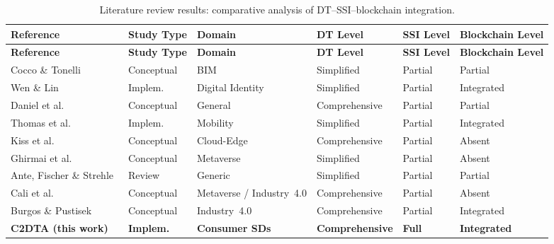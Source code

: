 \begin{longtable}{p{2.8cm} p{1.5cm} p{2cm} p{2cm} p{2cm} p{2cm}}
    \caption{Literature review results: comparative analysis of \ac{DT}--\ac{SSI}--blockchain integration.}
    \label{tab:related-work} \\
    \toprule
    \textbf{Reference} & \textbf{Study Type} & \textbf{Domain} & \textbf{\ac{DT} Level} & \textbf{\ac{SSI} Level} & \textbf{Blockchain Level} \\
    \midrule
    \endfirsthead
    \toprule
    \textbf{Reference} & \textbf{Study Type} & \textbf{Domain} & \textbf{\ac{DT} Level} & \textbf{\ac{SSI} Level} & \textbf{Blockchain Level} \\
    \midrule
    \endhead
    \bottomrule
    \endfoot

    Cocco \& Tonelli~\cite{cocco:tonelli:2024}
        & Conceptual & BIM & Simplified & Partial & Partial \\
    \addlinespace
    Wen \& Lin~\cite{wen:lin:2024}
        & Implem. & Digital Identity & Simplified & Partial & Integrated \\
    \addlinespace
    Daniel et al.~\cite{daniel:sriramulu:partheeban:etal:2024}
        & Conceptual & General & Comprehensive & Partial & Partial \\
    \addlinespace
    Thomas et al.~\cite{thomas:lakshmy:ramaguru:etal:2023}
        & Implem. & Mobility & Simplified & Partial & Integrated \\
    \addlinespace
    Kiss et al.~\cite{kiss:ullah:terstyanszky:etal:2024}
        & Conceptual & Cloud-Edge & Comprehensive & Partial & Absent \\
    \addlinespace
    Ghirmai et al.~\cite{ghirmai:mebrahtom:aloqaily:etal:2022}
        & Conceptual & Metaverse & Simplified & Partial & Absent \\
    \addlinespace
    Ante, Fischer \& Strehle~\cite{ante:fischer:strehle:2022}
        & Review & Generic & Simplified & Partial & Partial \\
    \addlinespace
    Cali et al.~\cite{cali:ferdous:karaarslan:etal:2022}
        & Conceptual & Metaverse / Industry~4.0 & Comprehensive & Partial & Absent \\
    \addlinespace
    Burgos \& Pustisek~\cite{burgos:pustisek:2023}
        & Conceptual & Industry~4.0 & Comprehensive & Partial & Integrated \\
    \addlinespace
    \textbf{C2DTA (this work)}
        & \textbf{Implem.} & \textbf{Consumer \acp{SD}} & \textbf{Comprehensive} & \textbf{Full} & \textbf{Integrated} \\

\end{longtable}

